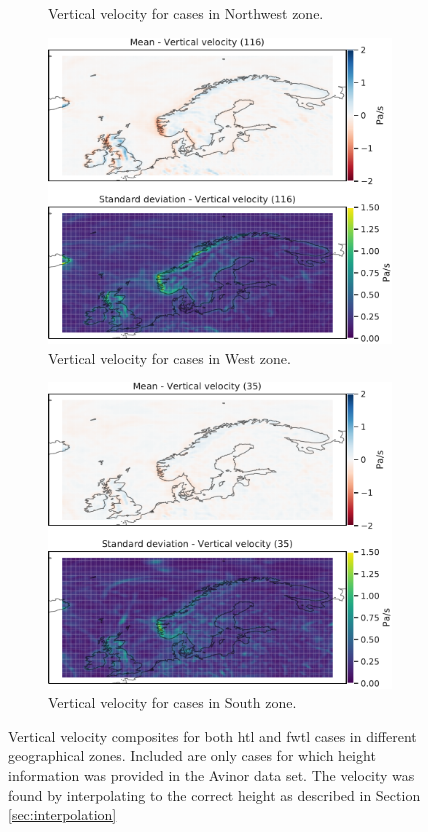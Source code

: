 \begin{figure}[H]
\begin{subfigure}[b]{0.49\textwidth}
    \caption{Vertical velocity  for cases in Northwest zone.}
    \label{fig:NordWestW}
\end{subfigure}
\begin{subfigure}[b]{0.49\textwidth}
    \centering
    \includegraphics[width=\textwidth]{Figures/WVest.pdf}
    \caption{Vertical velocity  for cases in West zone.}
    \label{fig:WestW}
\end{subfigure}
\begin{subfigure}[b]{0.49\textwidth}
    \centering
    \includegraphics[width=\textwidth]{Figures/WSor.pdf}
    \caption{Vertical velocity  for cases in South zone.}
    \label{fig:SouthW}
\end{subfigure}
\caption{Vertical velocity composites for both \acrshort{htl} and \acrshort{fwtl} cases in different geographical zones. Included are only cases for which height information was provided in the Avinor data set. The velocity was found by interpolating to the correct height as described in Section \ref{sec:interpolation}}
\label{fig:verticalzones}
\end{figure}

